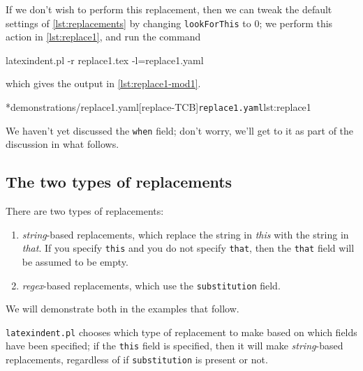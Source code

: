 If we don't wish to perform this replacement, then we can tweak the default settings of \vref{lst:replacements} 
by changing \texttt{lookForThis} to 0; we perform this action in \cref{lst:replace1}, and run the command
\begin{commandshell}
latexindent.pl -r replace1.tex -l=replace1.yaml
\end{commandshell}
which gives the output in \cref{lst:replace1-mod1}.

        \begin{cmhtcbraster}[raster column skip=.01\linewidth]
		\cmhlistingsfromfile*[style=yaml-LST]*{demonstrations/replace1.yaml}[replace-TCB]{\texttt{replace1.yaml}}{lst:replace1}
        \end{cmhtcbraster}
We haven't yet discussed the \texttt{when} field; don't worry, we'll get to it as part of the discussion in what follows.

\subsection{The two types of replacements}
There are two types of replacements:
\begin{enumerate}
  \item \emph{string}-based replacements, which replace the string in \emph{this} with the string in \emph{that}. 
    If you specify \texttt{this} and you do not specify \texttt{that}, then the \texttt{that} field will be assumed to be empty.
  \item \emph{regex}-based replacements, which use the \texttt{substitution} field.
\end{enumerate}
We will demonstrate both in the examples that follow. 

\texttt{latexindent.pl} chooses which type of replacement to make based on which fields have been specified; if the \texttt{this}
field is specified, then it will make \emph{string}-based replacements, regardless of if \texttt{substitution} is present or not.

